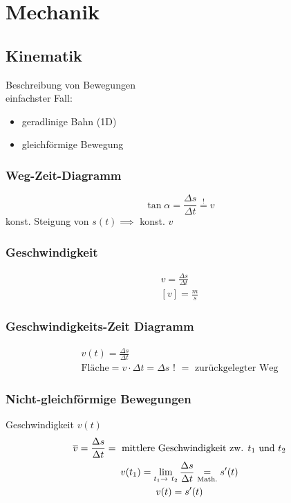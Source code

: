 \chapter{Mechanik}

\section{Kinematik}
Beschreibung von Bewegungen \\
einfachster Fall:
\begin{itemize}
	\item geradlinige Bahn (1D)
	\item gleichförmige Bewegung
\end{itemize}

\subsection{Weg-Zeit-Diagramm}
\[ \tan \alpha = \frac{\Delta s}{\Delta t} \overset{!}{=} v \]
konst. Steigung von $s(t) \implies$ konst. $v$

\subsection{Geschwindigkeit}
\begin{def*}[ note = Geschwindigkeit , index = Geschwindigkeit ]
	\begin{gather*}
		v = \frac{\Delta s}{\Delta t} \\
		[v] = \frac{m}{s}
	\end{gather*}
\end{def*}

\subsection{Geschwindigkeits-Zeit Diagramm}
\begin{gather*}
	v(t) = \frac{\Delta s}{\Delta t} \\
	\text{Fläche} = v \cdot \Delta t = \Delta s \text{ ! } = \text{ zurückgelegter Weg}
\end{gather*}

\subsection{Nicht-gleichförmige Bewegungen}
Geschwindigkeit $v(t)$
\begin{gather*}
	\overline{v} = \frac{\Delta s}{\Delta t} = \text{ mittlere Geschwindigkeit zw. $t_1$ und $t_2$} \\
	v(t_1) = \lim_{t_1 \rightarrow t_2} \frac{\Delta s}{\Delta t} \underset{\text{\scriptsize{Math.}}}{=} s'(t) \\
	v(t) = s'(t) \\
\end{gather*}

